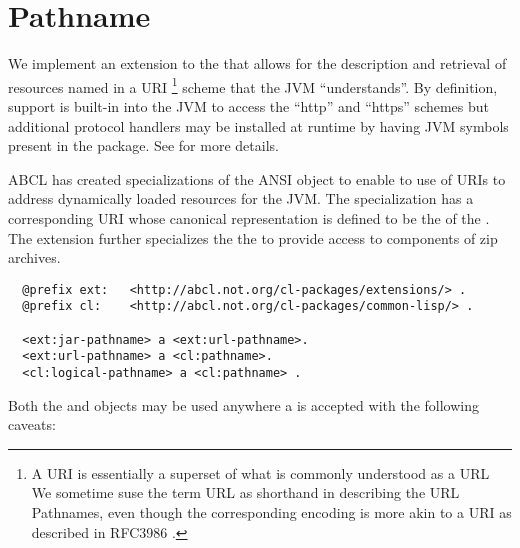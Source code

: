 \documentclass[10pt]{book}
\begin{document}
\section{Pathname}

We implement an extension to the  that allows for
the description and retrieval of resources named in a
\textsc{URI} \footnote{A \textsc{URI} is essentially a superset of
  what is commonly understood as a \textsc{URL} We sometime suse the
  term URL as shorthand in describing the URL Pathnames, even though
  the corresponding encoding is more akin to a URI as described in
  RFC3986 \cite{rfc3986}.}  scheme that the \textsc{JVM}
``understands''.  By definition, support is built-in into the JVM to
access the ``http'' and ``https'' schemes but additional protocol
handlers may be installed at runtime by having \textsc{JVM} symbols
present in the  package. See
\cite{maso2000} for more details.

\textsc{ABCL} has created specializations of the ANSI
 object to enable to use of \textsc{URI}s to address
dynamically loaded resources for the JVM.  The 
specialization has a corresponding \textsc{URI} whose canonical
representation is defined to be the  of the
. The  extension further
specializes the the  to provide access to
components of zip archives.  

\begin{verbatim}
  @prefix ext:   <http://abcl.not.org/cl-packages/extensions/> .
  @prefix cl:    <http://abcl.not.org/cl-packages/common-lisp/> .
  
  <ext:jar-pathname> a <ext:url-pathname>.
  <ext:url-pathname> a <cl:pathname>.
  <cl:logical-pathname> a <cl:pathname> .
\end{verbatim}

\label{EXTENSIONS:URL-PATHNAME}

\label{EXTENSIONS:JAR-PATHNAME}

Both the  and  objects
may be used anywhere a  is accepted with the
following caveats:
\end{document}
